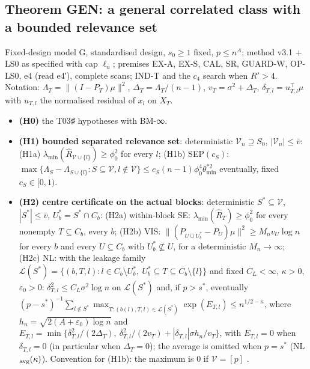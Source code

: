 \subsection{Theorem GEN: a general correlated class with a bounded relevance set}\label{sec:gen}
Fixed-design model G, standardised design, $s_0\ge1$ fixed, $p\le n^A$; method v3.1 + LS0 as specified with cap $\ell_n$; premises EX-A, EX-S, CAL, SR, GUARD-W, OP-LS0, e4 (read e4′), complete scans; IND-T and the $c_4$ search when $R'>4$. Notation: $\Lambda_T=\|(I-P_T)\mu\|^2$, $\Delta_T=\Lambda_T/(n-1)$, $v_T=\sigma^2+\Delta_T$, $\delta_{T,l}=u_{T,l}^\top\mu$ with $u_{T,l}$ the normalised residual of $x_l$ on $X_T$.
\begin{itemize}
\item \textbf{(H0)} the T03♯ hypotheses with BM-∞.
\item \textbf{(H1) bounded separated relevance set}: deterministic $\mathcal V_n\supseteq S_0$, $|\mathcal V_n|\le\bar{v}$: (H1a) $\lambda_{\min}(\hat{R}_{\mathcal V\cup\{l\}})\ge\phi_0^2$ for every $l$; (H1b) SEP$(c_S)$: $\max\{\Lambda_S-\Lambda_{S\cup\{l\}}:S\subseteq\mathcal V,l\notin\mathcal V\}\le c_S(n-1)\phi_0^4\theta^{*2}_{\min}$ eventually, fixed $c_S\in[0,1)$.
\item \textbf{(H2) centre certificate on the actual blocks}: deterministic $S^*\subseteq\mathcal V$, $|S^*|\le\bar{v}$, $U^*_b=S^*\cap C_b$: (H2a) within-block SE: $\lambda_{\min}(\hat{R}_T)\ge\phi_0^2$ for every nonempty $T\subseteq C_b$, every $b$; (H2b) VIS: $\|(P_{U\cup U^*_b}-P_U)\mu\|^2\ge M_nv_U\log n$ for every $b$ and every $U\subseteq C_b$ with $U^*_b\not\subseteq U$, for a deterministic $M_n\to\infty$; (H2c) NL: with the leakage family $\mathscr L(S^*)=\{(b,T,l):l\in C_b\setminus U_b^*,\ U_b^*\subseteq T\subseteq C_b\setminus\{l\}\}$ and fixed $C_L<\infty$, $\kappa>0$, $\varepsilon_0>0$: $\delta_{T,l}^2\le C_L\sigma^2\log n$ on $\mathscr L(S^*)$ and, if $p>s^*$, eventually $(p-s^*)^{-1}\sum_{l\notin S^*}\max_{T:(b(l),T,l)\in\mathscr L(S^*)}\exp(E_{T,l})\le n^{1/2-\kappa}$, where $h_n=\sqrt{2(A+\varepsilon_0)\log n}$ and $E_{T,l}=\min\{\delta_{T,l}^2/(2\Delta_T),\ \delta_{T,l}^2/(2v_T)+|\delta_{T,l}|\sigma h_n/v_T\}$, with $E_{T,l}=0$ when $\delta_{T,l}=0$ (in particular when $\Delta_T=0$); the average is omitted when $p=s^*$ (NL$_{\rm avg}(\kappa)$). Convention for (H1b): the maximum is $0$ if $\mathcal V=[p]$ .
\end{itemize}
